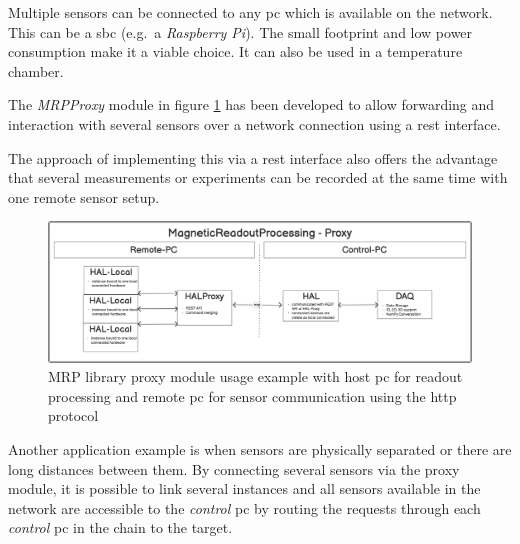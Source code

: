 Multiple sensors can be connected to any \gls{pc} which is available on
the network. This can be a \gls{sbc} (e.g.~a \emph{Raspberry Pi}). The
small footprint and low power consumption make it a viable choice. It
can also be used in a temperature chamber.

\newpage

The \emph{MRPProxy} module in figure
\ref{MRP_library_proxy_module_usage_example_with_host_(+pc)_for_readout_processing_and_remote_(+pc)_for_sensor_communication_using_the_http_protocol.png}
has been developed to allow forwarding and interaction with several
sensors over a network connection using a \gls{rest} interface.

The approach of implementing this via a \gls{rest} interface also offers
the advantage that several measurements or experiments can be recorded
at the same time with one remote sensor setup.

\begin{figure}
\centering
\includegraphics{./generated_images/border_MRP_library_proxy_module_usage_example_with_host_(+pc)_for_readout_processing_and_remote_(+pc)_for_sensor_communication_using_the_http_protocol.png}
\caption{MRP library proxy module usage example with host \gls{pc} for
readout processing and remote \gls{pc} for sensor communication using
the http protocol
\label{MRP_library_proxy_module_usage_example_with_host_(+pc)_for_readout_processing_and_remote_(+pc)_for_sensor_communication_using_the_http_protocol.png}}
\end{figure}

Another application example is when sensors are physically separated or
there are long distances between them. By connecting several sensors via
the proxy module, it is possible to link several instances and all
sensors available in the network are accessible to the \emph{control}
\gls{pc} by routing the requests through each \emph{control} \gls{pc} in
the chain to the target.

